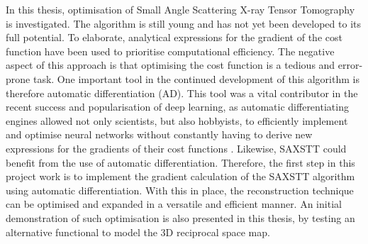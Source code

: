 In this thesis, optimisation of Small Angle Scattering X-ray Tensor Tomography is investigated.
The algorithm is still young and has not yet been developed to its full potential.
To elaborate, analytical expressions for the gradient of the cost function have been used to prioritise computational efficiency.
The negative aspect of this approach is that optimising the cost function is a tedious and error-prone task.
One important tool in the continued development of this algorithm is therefore automatic differentiation (AD).
This tool was a vital contributor in the recent success and popularisation of deep learning,
as automatic differentiating engines allowed not only scientists, but also hobbyists, to efficiently implement and optimise neural networks without constantly
having to derive new expressions for the gradients of their cost functions \cite{baydin2018automatic}. Likewise, SAXSTT could benefit from the use of automatic differentiation.
Therefore, the first step in this project work is to implement the gradient calculation of the SAXSTT algorithm using automatic differentiation.
With this in place, the reconstruction technique can be optimised and expanded in a versatile and efficient manner.
An initial demonstration of such optimisation is also presented in this thesis, by testing an alternative functional to model the 3D reciprocal space map.